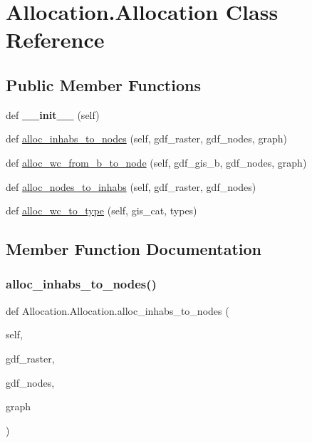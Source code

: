 \hypertarget{class_allocation_1_1_allocation}{}\section{Allocation.\+Allocation Class Reference}
\label{class_allocation_1_1_allocation}
\subsection*{Public Member Functions}
\begin{DoxyCompactItemize}
\item 
\mbox{\label{class_allocation_1_1_allocation_a3e9468db342283831f7cf2b818d49a86}} 
def {\bfseries \+\_\+\+\_\+init\+\_\+\+\_\+} (self)
\item 
def \hyperlink{class_allocation_1_1_allocation_afe048c89fb80434bd3095220118c41b0}{alloc\+\_\+inhabs\+\_\+to\+\_\+nodes} (self, gdf\+\_\+raster, gdf\+\_\+nodes, graph)
\item 
def \hyperlink{class_allocation_1_1_allocation_a5bd469a67d08d5b69e45fb6a3c74fda6}{alloc\+\_\+wc\+\_\+from\+\_\+b\+\_\+to\+\_\+node} (self, gdf\+\_\+gis\+\_\+b, gdf\+\_\+nodes, graph)
\item 
def \hyperlink{class_allocation_1_1_allocation_a2ca842ec76eda148406d56cf0d4153d8}{alloc\+\_\+nodes\+\_\+to\+\_\+inhabs} (self, gdf\+\_\+raster, gdf\+\_\+nodes)
\item 
def \hyperlink{class_allocation_1_1_allocation_ac8c7c2ea39a0b71a236fa2d7feda2447}{alloc\+\_\+wc\+\_\+to\+\_\+type} (self, gis\+\_\+cat, types)
\end{DoxyCompactItemize}


\subsection{Member Function Documentation}
\mbox{\label{class_allocation_1_1_allocation_afe048c89fb80434bd3095220118c41b0}} 
\subsubsection{\texorpdfstring{alloc\+\_\+inhabs\+\_\+to\+\_\+nodes()}{alloc\_inhabs\_to\_nodes()}}
{\footnotesize\ttfamily def Allocation.\+Allocation.\+alloc\+\_\+inhabs\+\_\+to\+\_\+nodes (\begin{DoxyParamCaption}\item[{}]{self,  }\item[{}]{gdf\+\_\+raster,  }\item[{}]{gdf\+\_\+nodes,  }\item[{}]{graph }\end{DoxyParamCaption})}


